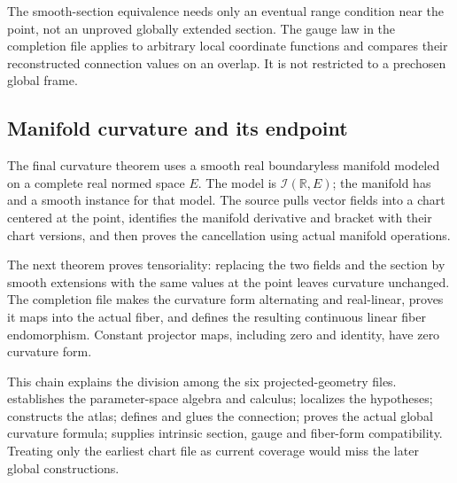 The smooth-section equivalence needs only an eventual range condition near the point, not an unproved globally extended section. The gauge law in the completion file applies to arbitrary local coordinate functions and compares their reconstructed connection values on an overlap. It is not restricted to a prechosen global frame.

\subsection{Manifold curvature and its endpoint}
The final curvature theorem uses a smooth real boundaryless manifold modeled on a complete real normed space $E$. The model is $\mathcal I(\mathbb R,E)$; the manifold has  and a smooth  instance for that model. The source pulls vector fields into a chart centered at the point, identifies the manifold derivative and bracket with their chart versions, and then proves the cancellation using actual manifold operations.



The next theorem proves tensoriality: replacing the two fields and the section by smooth extensions with the same values at the point leaves curvature unchanged. The completion file makes the curvature form alternating and real-linear, proves it maps into the actual fiber, and defines the resulting continuous linear fiber endomorphism. Constant projector maps, including zero and identity, have zero curvature form.

This chain explains the division among the six projected-geometry files.  establishes the parameter-space algebra and calculus;  localizes the hypotheses;  constructs the atlas;  defines and glues the connection;  proves the actual global curvature formula;  supplies intrinsic section, gauge and fiber-form compatibility. Treating only the earliest chart file as current coverage would miss the later global constructions.
